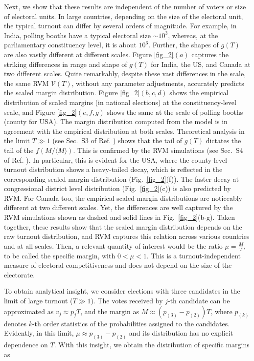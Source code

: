 \documentclass[reprint,aps,prl,showpacs,twocolumn, superscriptaddress]{revtex4-2}
\begin{document}
Next, we show that these results are independent of the number of voters or size of electoral units. In large countries, depending on the size of the electoral unit, the typical turnout can differ by several orders of magnitude. For example, in India, polling booths have a typical electoral size $\sim 10^3$, whereas, at the parliamentary constituency level, it is about $10^6$. Further, the shapes of $g(T)$ are also vastly different at different scales. Figure \ref{fig_2}$(a)$ captures the striking differences in range and shape of $g(T)$ for India, the US, and Canada at two different scales. Quite remarkably, despite these vast differences in the scale, the same RVM ${\mathcal V}(T)$, without any parameter adjustments, accurately predicts the scaled margin distribution. Figure \ref{fig_2}$(b, c, d)$ shows the empirical distribution of scaled margins (in national elections) at the constituency-level scale, and Figure \ref{fig_2}$(e, f, g)$ shows the same at the scale of polling booths (county for USA). The margin distribution computed from the model is in agreement with the empirical distribution at both scales. Theoretical analysis in the limit $T \gg 1$ (see Sec.~S3 of Ref. \cite{supp}) shows that the tail of $g(T)$ dictates the tail of the $f(M / \langle M \rangle)$. This is confirmed by the RVM simulations (see Sec.~S4 of Ref. \cite{supp}). In particular, this is evident for the USA, where the county-level turnout distribution shows a heavy-tailed decay, which is reflected in the corresponding scaled margin distribution (Fig.~\ref{fig_2}(f)). The faster decay at congressional district level distribution (Fig.~\ref{fig_2}(c)) is also predicted by RVM. For Canada too, the empirical scaled margin distributions are noticeably different at two different scales. Yet, the differences are well captured by the RVM simulations shown as dashed and solid lines in Fig.~\ref{fig_2}(b-g). Taken together, these results show that the scaled margin distribution depends on the raw turnout distribution, and RVM captures this relation across various countries and at all scales. Then, a relevant quantity of interest would be the ratio $\mu = \frac{M}{T}$, to be called the specific margin, with  $0<\mu<1$. This is a turnout-independent measure of electoral competitiveness and does not depend on the size of the electorate. 

To obtain analytical insight, we consider elections with three candidates in the limit of large turnout ($T \gg 1$). The votes received by $j$-th candidate can be approximated as $v_j \approx p_jT$, and the margin as $M \approx \left(p_{(3)} - p_{(2)}\right) T$, where $p_{(k)}$ denotes $k$-th order statistics \cite{BarBalNag2008} of the probabilities assigned to the candidates. Evidently, in this limit, $\mu \approx p_{(3)} - p_{(2)}$ and its distribution has no explicit dependence on $T$. With this insight, we obtain the distribution of specific margins as \cite{supp}
\end{document}
